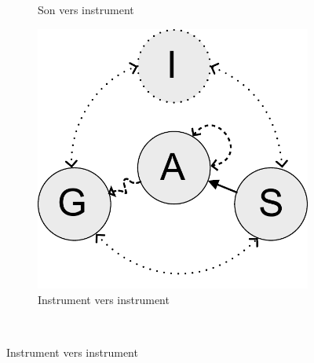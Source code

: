 \begin{figure}[!htbp]
{\begin{subfigure}[b]{.33\textwidth}
			\caption{Son vers instrument}
		\end{subfigure}%
		\hspace{.02\linewidth}
		\begin{subfigure}[b]{.33\textwidth}
			\centering
			\includegraphics[width=0.9\linewidth]{gfx/03_gesture/gesture-inference-a.pdf}
			\caption{Instrument vers instrument}
		\end{subfigure}%
	}\\
\end{figure}
